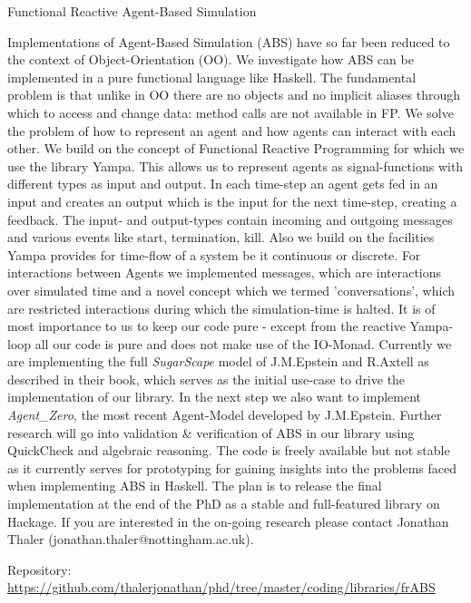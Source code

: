 \documentclass[DIV16,twocolumn,10pt]{scrreprt}
\begin{document}
\begin{hcarentry}{Functional Reactive Agent-Based Simulation}
\makeheader

Implementations of Agent-Based Simulation (ABS) have so far been reduced to the context of Object-Orientation (OO). We investigate how ABS can be implemented in a pure functional language like Haskell. The fundamental problem is that unlike in OO there are no objects and no implicit aliases through which to access and change data: method calls are not available in FP. We solve the problem of how to represent an agent and how agents can interact with each other. We build on the concept of Functional Reactive Programming for which we use the library Yampa. This allows us to represent agents as signal-functions with different types as input and output. In each time-step an agent gets fed in an input and creates an output which is the input for the next time-step, creating a feedback. The input- and output-types contain incoming and outgoing messages and various events like start, termination, kill. Also we build on the facilities Yampa provides for time-flow of a system be it continuous or discrete. For interactions between Agents we implemented messages, which are interactions over simulated time and a novel concept which we termed 'conversations', which are restricted interactions during which the simulation-time is halted. It is of most importance to us to keep our code pure - except from the reactive Yampa-loop all our code is pure and does not make use of the IO-Monad. Currently we are implementing the full \textit{SugarScape} model of J.M.Epstein and R.Axtell as described in their book, which serves as the initial use-case to drive the implementation of our library. In the next step we also want to implement \textit{Agent\_Zero}, the most recent Agent-Model developed by J.M.Epstein. Further research will go into validation \& verification of ABS in our library using QuickCheck and algebraic reasoning. The code is freely available but not stable as it currently serves for prototyping for gaining insights into the problems faced when implementing ABS in Haskell. The plan is to release the final implementation at the end of the PhD as a stable and full-featured library on Hackage. If you are interested in the on-going research please contact Jonathan Thaler (jonathan.thaler@nottingham.ac.uk).

\FurtherReading
  Repository: \url{https://github.com/thalerjonathan/phd/tree/master/coding/libraries/frABS}
\end{hcarentry}
\end{document}
